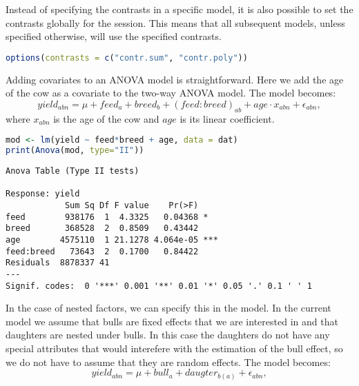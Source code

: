 Instead of specifying the contrasts in a specific model, it is also
possible to set the contrasts globally for the session. This means that
all subsequent models, unless specified otherwise, will use the
specified contrasts.

\begin{lstlisting}[language=R, columns=fullflexible, basicstyle=\linespread{0.85}\small\ttfamily, stringstyle=\color{DarkGreen}, keywordstyle=\color{blue}, commentstyle=\color{DarkGreen},]
options(contrasts = c("contr.sum", "contr.poly"))
\end{lstlisting}

\label{covariates-in-anova}

Adding covariates to an ANOVA model is straightforward. Here we add the
age of the cow as a covariate to the two-way ANOVA model. The model
becomes:
\[yield_{abn} = \mu + feed_a + breed_b + (feed:breed)_{ab} + age\cdot x_{abn} + \epsilon_{abn},\]
where \(x_{abn}\) is the age of the cow and \(age\) is its linear
coefficient.

\begin{lstlisting}[language=R, columns=fullflexible, basicstyle=\linespread{0.85}\small\ttfamily, stringstyle=\color{DarkGreen}, keywordstyle=\color{blue}, commentstyle=\color{DarkGreen},]
mod <- lm(yield ~ feed*breed + age, data = dat)
print(Anova(mod, type="II"))
\end{lstlisting}
\begin{Verbatim}[fontsize=\small]
Anova Table (Type II tests)

Response: yield
            Sum Sq Df F value    Pr(>F)
feed        938176  1  4.3325   0.04368 *
breed       368528  2  0.8509   0.43442
age        4575110  1 21.1278 4.064e-05 ***
feed:breed   73643  2  0.1700   0.84422
Residuals  8878337 41
---
Signif. codes:  0 '***' 0.001 '**' 0.01 '*' 0.05 '.' 0.1 ' ' 1
\end{Verbatim}

\label{fixed-effect-nested-anova}

In the case of nested factors, we can specify this in the model. In the
current model we assume that bulls are fixed effects that we are
interested in and that daughters are nested under bulls. In this case
the daughters do not have any special attributes that would interefere
with the estimation of the bull effect, so we do not have to assume that
they are random effects. The model becomes:
\[yield_{abn} = \mu + bull_a + daugter_{b(a)} + \epsilon_{abn},\]

